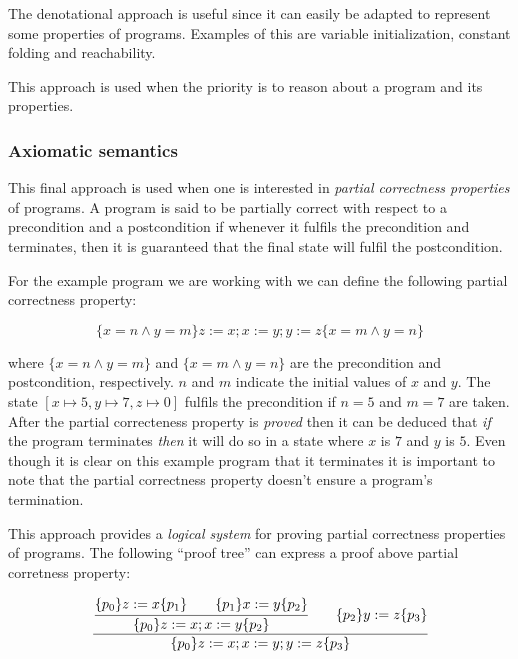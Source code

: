The denotational approach is useful since it can easily be adapted to represent some properties of programs.
Examples of this are variable initialization, constant folding and reachability.

This approach is used when the priority is to reason about a program and its properties.

\begin{comment}
what the program does oposed to how it does it. Modifying mathematical objects.
\end{comment}

\subsubsection{Axiomatic semantics}

This final approach is used when one is interested in \textit{partial correctness properties} of programs.
A program is said to be partially correct with respect to a precondition and a postcondition if whenever it fulfils the precondition and terminates, then it is guaranteed that the final state will fulfil the postcondition.

For the example program we are working with we can define the following partial correctness property:

\begin{equation*}
\lbrace x=n \land y=m \rbrace z:=x; x:=y; y:=z \lbrace x=m \land y=n \rbrace
\end{equation*}

where $\lbrace x=n \land y=m \rbrace $ and $\lbrace x=m \land y=n \rbrace $ are the precondition and postcondition, respectively.
$n$ and $m$ indicate the initial values of $x$ and $y$.
The state $[x\mapsto5, y\mapsto7, z\mapsto0]$ fulfils the precondition if $n=5$ and $m=7$ are taken.
After the partial correcteness property is \textit{proved} then it can be deduced that \textit{if} the program terminates \textit{then} it will do so in a state where $x$ is $7$ and $y$ is $5$.
Even though it is clear on this example program that it terminates it is important to note that the partial correctness property doesn't ensure a program's termination.

This approach provides a \textit{logical system} for proving partial correctness properties of programs.
The following ``proof tree'' can express a proof above partial corretness property:

\begin{equation*}
\cfrac{
  \cfrac{ \lbrace p_{0} \rbrace z:=x \lbrace p_{1} \rbrace \qquad \lbrace p_{1} \rbrace x:=y \lbrace p_{2} \rbrace }
    { \lbrace p_{0} \rbrace z:=x; x:=y \lbrace p_{2} \rbrace }
  \qquad
 \lbrace p_{2} \rbrace y:=z \lbrace p_{3} \rbrace
  }
  { \lbrace p_{0} \rbrace z:=x; x:=y; y:=z \lbrace p_{3} \rbrace }
\end{equation*}

